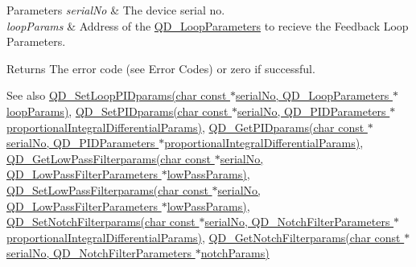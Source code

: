 \begin{DoxyParams}{Parameters}
{\em serial\+No} & The device serial no. \\
\hline
{\em loop\+Params} & Address of the \hyperlink{struct_q_d___loop_parameters}{Q\+D\+\_\+\+Loop\+Parameters} to recieve the Feedback Loop Parameters. \\
\hline
\end{DoxyParams}
\begin{DoxyReturn}{Returns}
The error code (see Error Codes) or zero if successful. 
\end{DoxyReturn}
\begin{DoxySeeAlso}{See also}
\hyperlink{group___t_cube_quad_gad75ed2cff04b2d218326841b2553af0a}{Q\+D\+\_\+\+Set\+Loop\+P\+I\+Dparams(char const $\ast$serial\+No, Q\+D\+\_\+\+Loop\+Parameters $\ast$loop\+Params)}, \hyperlink{group___t_cube_quad_gac4cc242d12537c25f48b86e73138c3d1}{Q\+D\+\_\+\+Set\+P\+I\+Dparams(char const $\ast$serial\+No, Q\+D\+\_\+\+P\+I\+D\+Parameters $\ast$proportional\+Integral\+Differential\+Params)}, \hyperlink{group___t_cube_quad_ga2e1be6be7d8bb5c822766a44205889ae}{Q\+D\+\_\+\+Get\+P\+I\+Dparams(char const $\ast$serial\+No, Q\+D\+\_\+\+P\+I\+D\+Parameters $\ast$proportional\+Integral\+Differential\+Params)}, \hyperlink{group___t_cube_quad_ga698c72e36ea50417955b08b69215fcf5}{Q\+D\+\_\+\+Get\+Low\+Pass\+Filterparams(char const $\ast$serial\+No, Q\+D\+\_\+\+Low\+Pass\+Filter\+Parameters $\ast$low\+Pass\+Params)}, \hyperlink{group___t_cube_quad_ga2e8b2f659d9008af335d876976450bc5}{Q\+D\+\_\+\+Set\+Low\+Pass\+Filterparams(char const $\ast$serial\+No, Q\+D\+\_\+\+Low\+Pass\+Filter\+Parameters $\ast$low\+Pass\+Params)}, \hyperlink{group___t_cube_quad_ga00572c166108d5bd60ed0ab5eae7d83c}{Q\+D\+\_\+\+Set\+Notch\+Filterparams(char const $\ast$serial\+No, Q\+D\+\_\+\+Notch\+Filter\+Parameters $\ast$proportional\+Integral\+Differential\+Params)}, \hyperlink{group___t_cube_quad_ga5132ce023e2c0248a42cb5cdf0a95c3e}{Q\+D\+\_\+\+Get\+Notch\+Filterparams(char const $\ast$serial\+No, Q\+D\+\_\+\+Notch\+Filter\+Parameters $\ast$notch\+Params)}


\end{DoxySeeAlso}
